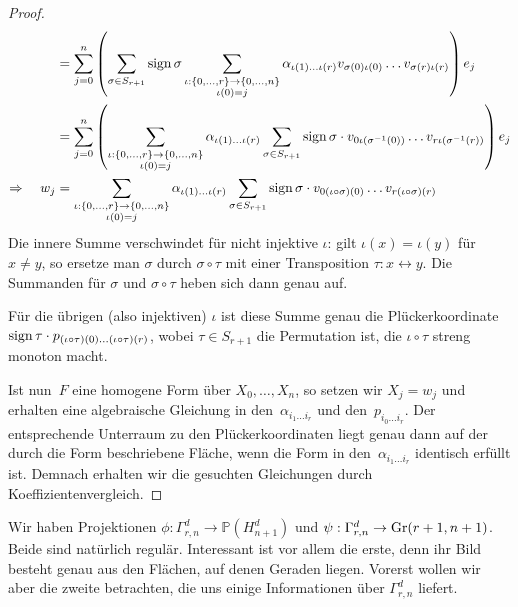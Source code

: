 \begin{proof}
\begin{align*}
	&= \sum_{j=0}^n \left(\sum\limits_{\sigma \in S_{r+1}} \operatorname{sign} \sigma \sum_{\substack{\iota: \{0, \dots, r\} \rightarrow \{0, \dots, n\} \\ \iota(0)=j }} \alpha_{\iota(1) \dots \iota(r)} v_{\sigma(0)\iota(0)} \dots v_{\sigma(r)\iota(r)}\right) e_j \\
	&= \sum_{j=0}^n \left(\sum_{\substack{\iota: \{0, \dots, r\} \rightarrow \{0, \dots, n\} \\ \iota(0)=j }} \alpha_{\iota(1) \dots \iota(r)} \sum\limits_{\sigma \in S_{r+1}} \operatorname{sign} \sigma \cdot v_{0\iota(\sigma^{-1}(0))} \dots v_{r\iota(\sigma^{-1}(r))}\right) e_j \\
\Rightarrow\quad w_j	&= \sum_{\substack{\iota: \{0, \dots, r\} \rightarrow \{0, \dots, n\} \\ \iota(0)=j }} \alpha_{\iota(1) \dots \iota(r)} \sum\limits_{\sigma \in S_{r+1}} \operatorname{sign} \sigma \cdot v_{0(\iota\circ\sigma)(0)} \dots v_{r(\iota\circ\sigma)(r)}
\end{align*}
Die innere Summe verschwindet für nicht injektive $\iota$: gilt $\iota(x) = \iota(y)$ für $x \neq y$, so ersetze man $\sigma$ durch $\sigma \circ \tau$ mit einer Transposition $\tau: x \leftrightarrow y$. Die Summanden für $\sigma$ und $\sigma \circ \tau$ heben sich dann genau auf.

Für die übrigen (also injektiven) $\iota$ ist diese Summe genau die Plückerkoordinate $\operatorname{sign} \tau \cdot p_{(\iota\circ\tau)(0)\dots(\iota\circ\tau)(r)}$, wobei $\tau \in S_{r+1}$ die Permutation ist, die $\iota \circ \tau$ streng monoton macht.

Ist nun~$F$ eine homogene Form über $X_0, \dots, X_n$, so setzen wir $X_j = w_j$ und erhalten eine algebraische Gleichung in den~$\alpha_{i_1 \dots i_r}$ und den~$p_{i_0 \dots i_r}$. Der entsprechende Unterraum zu den Plückerkoordinaten liegt genau dann auf der durch die Form beschriebene Fläche, wenn die Form in den~$\alpha_{i_1 \dots i_r}$ identisch erfüllt ist. Demnach erhalten wir die gesuchten Gleichungen durch Koeffizientenvergleich.
\end{proof}

Wir haben Projektionen $\phi \colon \Gamma_{r,n}^d \to \mathbb P(H_{n+1}^d)$ und $\psi: \Gamma_{r,n}^d \to \grass r+1/{n+1}$. Beide sind natürlich regulär. Interessant ist vor allem die erste, denn ihr Bild besteht genau aus den Flächen, auf denen Geraden liegen. Vorerst wollen wir aber die zweite betrachten, die uns einige Informationen über $\Gamma_{r,n}^d$ liefert.

